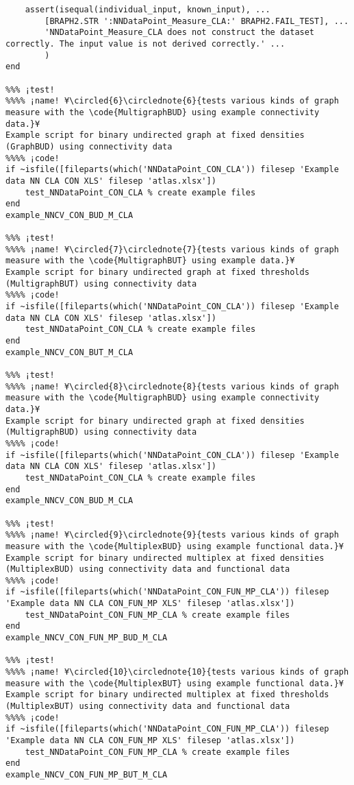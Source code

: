 \documentclass{tufte-handout}
\begin{document}
\begin{lstlisting}
    assert(isequal(individual_input, known_input), ...
        [BRAPH2.STR ':NNDataPoint_Measure_CLA:' BRAPH2.FAIL_TEST], ...
        'NNDataPoint_Measure_CLA does not construct the dataset correctly. The input value is not derived correctly.' ...
        )
end

%%% ¡test!
%%%% ¡name! ¥\circled{6}\circlednote{6}{tests various kinds of graph measure with the \code{MultigraphBUD} using example connectivity data.}¥
Example script for binary undirected graph at fixed densities (GraphBUD) using connectivity data
%%%% ¡code!
if ~isfile([fileparts(which('NNDataPoint_CON_CLA')) filesep 'Example data NN CLA CON XLS' filesep 'atlas.xlsx'])
    test_NNDataPoint_CON_CLA % create example files
end
example_NNCV_CON_BUD_M_CLA

%%% ¡test!
%%%% ¡name! ¥\circled{7}\circlednote{7}{tests various kinds of graph measure with the \code{MultigraphBUT} using example data.}¥
Example script for binary undirected graph at fixed thresholds (MultigraphBUT) using connectivity data
%%%% ¡code!
if ~isfile([fileparts(which('NNDataPoint_CON_CLA')) filesep 'Example data NN CLA CON XLS' filesep 'atlas.xlsx'])
    test_NNDataPoint_CON_CLA % create example files
end
example_NNCV_CON_BUT_M_CLA

%%% ¡test!
%%%% ¡name! ¥\circled{8}\circlednote{8}{tests various kinds of graph measure with the \code{MultigraphBUD} using example connectivity data.}¥
Example script for binary undirected graph at fixed densities (MultigraphBUD) using connectivity data
%%%% ¡code!
if ~isfile([fileparts(which('NNDataPoint_CON_CLA')) filesep 'Example data NN CLA CON XLS' filesep 'atlas.xlsx'])
    test_NNDataPoint_CON_CLA % create example files
end
example_NNCV_CON_BUD_M_CLA

%%% ¡test!
%%%% ¡name! ¥\circled{9}\circlednote{9}{tests various kinds of graph measure with the \code{MultiplexBUD} using example functional data.}¥
Example script for binary undirected multiplex at fixed densities (MultiplexBUD) using connectivity data and functional data
%%%% ¡code!
if ~isfile([fileparts(which('NNDataPoint_CON_FUN_MP_CLA')) filesep 'Example data NN CLA CON_FUN_MP XLS' filesep 'atlas.xlsx'])
    test_NNDataPoint_CON_FUN_MP_CLA % create example files
end
example_NNCV_CON_FUN_MP_BUD_M_CLA

%%% ¡test!
%%%% ¡name! ¥\circled{10}\circlednote{10}{tests various kinds of graph measure with the \code{MultiplexBUT} using example functional data.}¥
Example script for binary undirected multiplex at fixed thresholds (MultiplexBUT) using connectivity data and functional data
%%%% ¡code!
if ~isfile([fileparts(which('NNDataPoint_CON_FUN_MP_CLA')) filesep 'Example data NN CLA CON_FUN_MP XLS' filesep 'atlas.xlsx'])
    test_NNDataPoint_CON_FUN_MP_CLA % create example files
end
example_NNCV_CON_FUN_MP_BUT_M_CLA

\end{lstlisting}

%
%
\end{document}
